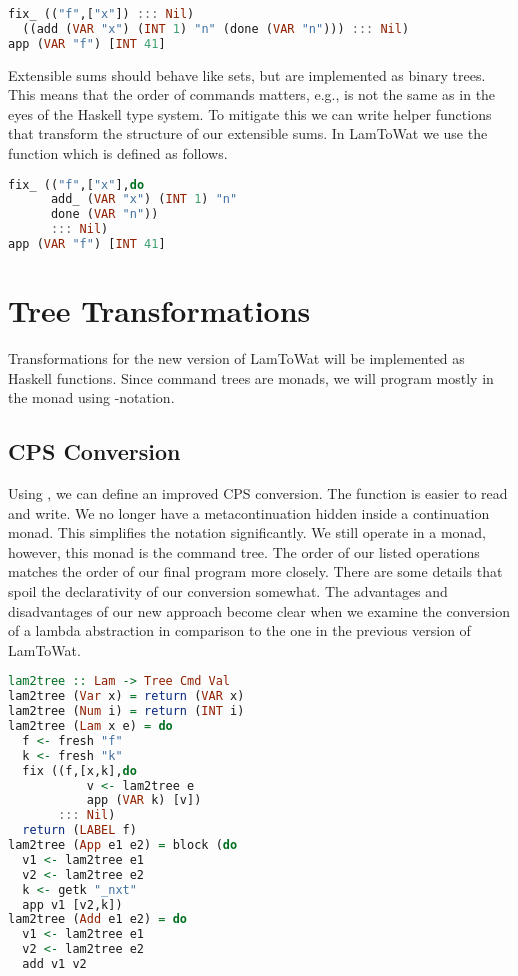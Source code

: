 \begin{lstlisting}[language=Haskell]
fix_ (("f",["x"]) ::: Nil)
  ((add (VAR "x") (INT 1) "n" (done (VAR "n"))) ::: Nil)
app (VAR "f") [INT 41]
\end{lstlisting}

Extensible sums should behave like sets, but are implemented as binary trees. This means that the order of commands matters, e.g.,  is not the same as  in the eyes of the Haskell type system. To mitigate this we can write helper functions that transform the structure of our extensible sums. In LamToWat we use the  function which is defined as follows. 

\begin{lstlisting}[language=Haskell]
fix_ (("f",["x"],do
      add_ (VAR "x") (INT 1) "n"
      done (VAR "n"))
      ::: Nil)
app (VAR "f") [INT 41]
\end{lstlisting}

\section{\label{section:treensforms}Tree Transformations}
Transformations for the new version of LamToWat will be implemented as Haskell functions. Since command trees are monads, we will program mostly in the monad using -notation. 

\subsection{\label{subsection:cpsconvert2}CPS Conversion}
Using , we can define an improved CPS conversion. The function is easier to read and write. We no longer have a metacontinuation hidden inside a continuation monad. This simplifies the notation significantly. We still operate in a monad, however, this monad is the command tree. The order of our listed operations matches the order of our final program more closely. There are some details that spoil the declarativity of our conversion somewhat. The advantages and disadvantages of our new approach become clear when we examine the conversion of a lambda abstraction in comparison to the one in the previous version of LamToWat.

\begin{lstlisting}[language=Haskell]
lam2tree :: Lam -> Tree Cmd Val
lam2tree (Var x) = return (VAR x)
lam2tree (Num i) = return (INT i)
lam2tree (Lam x e) = do
  f <- fresh "f"
  k <- fresh "k"
  fix ((f,[x,k],do
           v <- lam2tree e
           app (VAR k) [v])
       ::: Nil)
  return (LABEL f)
lam2tree (App e1 e2) = block (do
  v1 <- lam2tree e1
  v2 <- lam2tree e2
  k <- getk "_nxt"
  app v1 [v2,k])
lam2tree (Add e1 e2) = do
  v1 <- lam2tree e1
  v2 <- lam2tree e2
  add v1 v2
\end{lstlisting}

